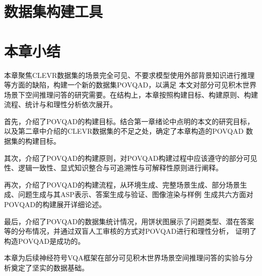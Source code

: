 \section{数据集构建工具}
\section{本章小结}
本章聚焦CLEVR数据集的场景完全可见、不要求模型使用外部背景知识进行推理等方面的缺陷，构建一个新的数据集POVQAD，以满足
本文对部分可见积木世界场景下空间推理问答的研究需要。在结构上，本章按照构建目标、构建原则、构建流程、统计与和理性分析依次展开。

首先，介绍了POVQAD的构建目标。结合第一章绪论中点明的本文的研究目标，以及第二章中介绍的CLEVR数据集的不足之处，确定了本章构造的POVQAD
数据集的构建目标。

其次，介绍了POVQAD的构建原则，对POVQAD构建过程中应该遵守的部分可见性、逻辑一致性、显式知识整合与可追溯性与可解释性原则进行阐释。

再次，介绍了POVQAD的构建流程，从环境生成、完整场景生成、部分场景生成、问题生成与其ASP表示、答案生成与验证、图像渲染与样例
生成共六方面对POVQAD的构建展开详细论述。

最后，介绍了POVQAD的数据集统计情况，用饼状图展示了问题类型、潜在答案等的分布情况，并通过双盲人工审核的方式对POVQAD进行和理性分析，
证明了构造POVQAD是成功的。

本章为后续神经符号VQA框架在部分可见积木世界场景空间推理问答的实验与分析奠定了坚实的数据基础。
